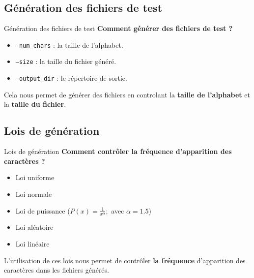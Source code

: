 \documentclass{beamer}
\begin{document}
\subsection{Génération des fichiers de test}

\begin{frame}{Génération des fichiers de test}
    \centering
    \large\textbf{Comment générer des fichiers de test ?}

    \vspace{20pt}

    \begin{itemize}
        \item \texttt{--num\_chars} : la taille de l'alphabet.
        \item \texttt{--size} : la taille du fichier généré.
        \item \texttt{--output\_dir} : le répertoire de sortie.
    \end{itemize}

    \vspace{20pt}
    Cela nous permet de générer des fichiers en controlant la
    \textbf{taille de l'alphabet} et la \textbf{taille du fichier}.

\end{frame}

\subsection{Lois de génération}
\begin{frame}{Lois de génération}
    \centering
    \large\textbf{Comment contrôler la fréquence d'apparition des caractères ?}

    \vspace{15pt}
    \begin{itemize}
        \item Loi uniforme
        \item Loi normale
        \item Loi de puissance ($P(x) = \frac{1}{x^\alpha} ;$ avec $\alpha = 1.5$)
        \item Loi aléatoire
        \item Loi linéaire
    \end{itemize}

    \vspace{10pt}
    L'utilisation de ces lois nous permet de contrôler \textbf{la fréquence}
    d'apparition des caractères dans les fichiers générés.

\end{frame}
\end{document}
